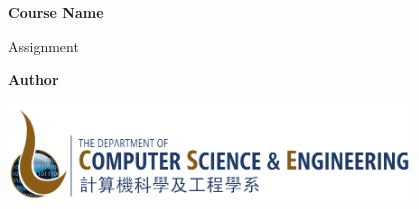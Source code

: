 \begin{titlepage}
    \begin{center}
        \vspace*{3cm}
            
        \Huge
        \textbf{Course Name}
            
        \vspace{1cm}
        \huge
        Assignment 
            
        


            
        \vspace{1.5cm}
        \Large
            
        \textbf{Author}                      %
        
            
        \vfill
        
       
     
        \includegraphics[width=0.8\textwidth]{pics/CSE_logo.pdf}
        \\
        
 
            
    \end{center}
\end{titlepage}